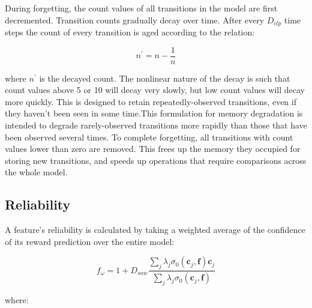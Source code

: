 During forgetting, the count values of all transitions in the model are first decremented. Transition counts gradually decay over time. After every $D_{clp}$ time steps  the count of every transition is aged according to the relation:

\begin{equation}
n^\prime = n - \frac{1}{n}
\end{equation}

where $n^\prime$ is the decayed count. The nonlinear nature of the decay is such that count values above 5 or 10 will decay very slowly, but low count values will decay more quickly. This is designed to retain repeatedly-observed transitions, even if they haven't been seen in some time.This formulation for memory degradation is intended to degrade rarely-observed transitions more rapidly than those that have been observed several times.  To complete forgetting, all transitions with count values lower than zero are removed. This frees up the memory they occupied for storing new transitions, and speeds up operations that require comparisons across the whole model.

\subsection{Reliability}
\label{reliability}

A feature's reliability is calculated by taking a weighted average of the confidence of its reward prediction over the entire model:

\begin{equation}
f_\omega= 1 + D_{saw}\frac{\sum\limits_j \lambda_j \sigma_0(\mathbf{c}_j, \mathbf{f})  \mathbf{c}_j}{\sum\limits_j \lambda_j \sigma_0(\mathbf{c}_j, \mathbf{f})}
\end{equation}

where:

